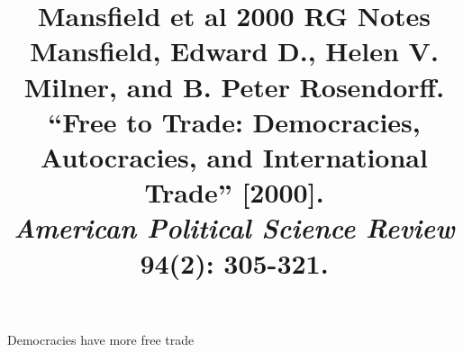 \documentclass[12pt]{article}
\title{\textbf{Mansfield et al 2000 RG Notes}\\
\large Mansfield, Edward D., Helen V. Milner, and B. Peter Rosendorff. ``Free to Trade: Democracies, Autocracies, and International Trade'' [2000].\\
\textit{American Political Science Review} 94(2): 305-321.}
\author{}
\date{}
\begin{document}
\maketitle

Democracies have more free trade
\end{document}
